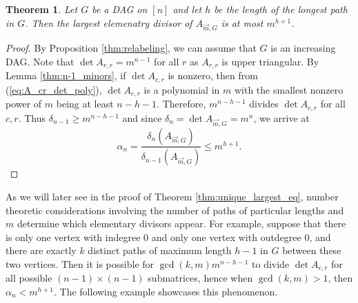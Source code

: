 \documentclass[12pt]{amsart}
\newtheorem{thm}{Theorem}[section]
\theoremstyle{definition}
\numberwithin{equation}{section}
\renewcommand\>{\rangle}
\newcommand\<{\langle}
\newcommand\0{\mathbf{0}}
\begin{document}
\begin{thm}\label{thm:largest_bound}
	Let $G$ be a DAG on $[n]$ and let $h$ be the length of the longest path in $G$. 
	Then the largest elemenatry divisor of $A_{\vec{m} ,G}$ is at most $m^{h+1}$.
\end{thm}	
\begin{proof}
	By Proposition \ref{thm:relabeling}, we can assume that $G$ is an increasing DAG.
	Note that $\det A_{r,r} = m^{n-1}$ for all $r$ as $A_{r,r}$ is upper triangular. By Lemma \ref{thm:n-1_minors}, if $\det A_{c,r}$ is nonzero, then from (\ref{eq:A_cr_det_poly}), $\det A_{c,r}$ is a polynomial in $m$ with the smallest nonzero power of $m$ being at least $n-h-1$. Therefore, $m^{n-h-1}$ divides $\det A_{c,r}$ for all $c,r$. Thus $\delta_{n-1} \geq m^{n-h-1}$ and since $\delta_n = \det A_{\vec{m} ,G} = m^n$, we arrive at
	\[\alpha_n = \frac{\delta_n(A_{\vec{m}, G})}{\delta_{n-1}(A_{\vec{m}, G})} \leq m^{h+1}.\]
\end{proof}

As we will later see in the proof of Theorem \ref{thm:unique_largest_eq}, number theoretic considerations involving the number of paths of particular lengths and $m$ determine which elementary divisors appear. 
For example, suppose that there is only one vertex with indegree 0 and only one vertex with outdegree 0, and there are exactly $k$ distinct paths of maximum length $h-1$ in $G$ between these two vertices. 
Then it is possible for $\gcd(k,m)m^{n-h-1}$ to divide $\det A_{c,r}$ for all possible $(n-1)\times(n-1)$ submatrices, hence when $\gcd(k,m) > 1$, then $\alpha_n < m^{h+1}$.
The following example showcases this phenomenon. 
\end{document}
